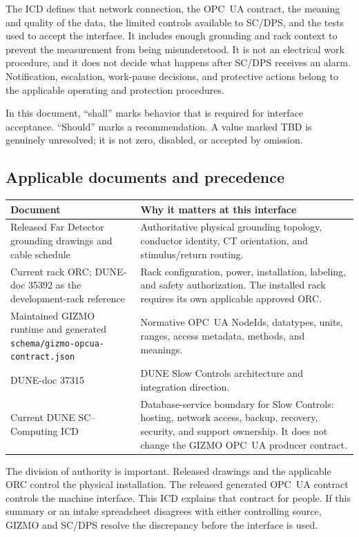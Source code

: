 \documentclass{cernatlasnote}
\newcommand{\code}[1]{\nolinkurl{#1}}
\begin{document}
The ICD defines that network connection, the OPC~UA contract, the meaning and
quality of the data, the limited controls available to SC/DPS, and the tests
used to accept the interface. It includes enough grounding and rack context to
prevent the measurement from being misunderstood. It is not an electrical work
procedure, and it does not decide what happens after SC/DPS receives an alarm.
Notification, escalation, work-pause decisions, and protective actions belong
to the applicable operating and protection procedures.

In this document, ``shall'' marks behavior that is required for interface
acceptance. ``Should'' marks a recommendation. A value marked TBD is genuinely
unresolved; it is not zero, disabled, or accepted by omission.

\subsection{Applicable documents and precedence}

\begin{longtable}{L{0.32\textwidth} L{0.58\textwidth}}
\toprule
\textbf{Document} & \textbf{Why it matters at this interface} \\
\midrule
Released Far Detector grounding drawings and cable schedule & Authoritative
physical grounding topology, conductor identity, CT orientation, and
stimulus/return routing. \\
\addlinespace
Current rack ORC; DUNE-doc 35392 as the development-rack reference & Rack
configuration, power, installation, labeling, and safety authorization. The
installed rack requires its own applicable approved ORC. \\
\addlinespace
Maintained GIZMO runtime and generated
\code{schema/gizmo-opcua-contract.json} & Normative OPC~UA NodeIds, datatypes,
units, ranges, access metadata, methods, and meanings. \\
\addlinespace
DUNE-doc 37315 & DUNE Slow Controls architecture and integration direction. \\
\addlinespace
Current DUNE SC--Computing ICD & Database-service boundary for Slow Controls:
hosting, network access, backup, recovery, security, and support ownership. It
does not change the GIZMO OPC~UA producer contract. \\
\bottomrule
\end{longtable}

The division of authority is important. Released drawings and the applicable
ORC control the physical installation. The released generated OPC~UA contract
controls the machine interface. This ICD explains that contract for people. If
this summary or an intake spreadsheet disagrees with either controlling source,
GIZMO and SC/DPS resolve the discrepancy before the interface is used.
\end{document}
